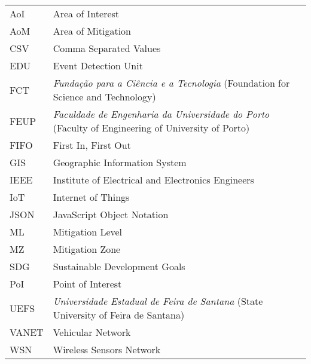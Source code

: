 \begin{thesisabbreviations}
\begin{footnotesize}
\begin{longtable}[l]{p{2cm}l}

    AoI     \dotfill & Area of Interest \\
    AoM     \dotfill & Area of Mitigation \\
    CSV     \dotfill & Comma Separated Values \\
    EDU     \dotfill & Event Detection Unit \\
    FCT     \dotfill & \textit{Fundação para a Ciência e a Tecnologia} (Foundation for Science and Technology) \\
    FEUP    \dotfill & \textit{Faculdade de Engenharia da Universidade do Porto} (Faculty of Engineering of University of Porto) \\
    FIFO    \dotfill & First In, First Out \\
    GIS     \dotfill & Geographic Information System \\
    IEEE    \dotfill & Institute of Electrical and Electronics Engineers \\
    IoT     \dotfill & Internet of Things \\
    JSON    \dotfill & JavaScript Object Notation \\
    ML      \dotfill & Mitigation Level \\
    MZ      \dotfill & Mitigation Zone \\
    SDG     \dotfill & Sustainable Development Goals \\
    PoI     \dotfill & Point of Interest \\
    UEFS    \dotfill & \textit{Universidade Estadual de Feira de Santana} (State University of Feira de Santana) \\
    VANET   \dotfill & Vehicular Network \\
    WSN     \dotfill & Wireless Sensors Network \\

\end{longtable}
\end{footnotesize}
\end{thesisabbreviations}
